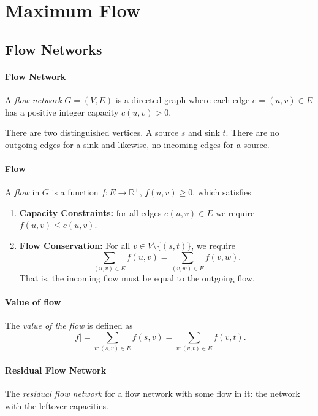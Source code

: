 
\section{Maximum Flow}

\subsection{Flow Networks}
\paragraph{Flow Network} A \textit{flow network} 
\( G = (V, E) \) is a directed graph where each edge \( e = (u, v) \in  E \) has a 
positive integer capacity \( c(u, v) > 0 \).

There are two distinguished vertices. A source \( s \) and sink  \( t \).
There are no outgoing edges for a sink and likewise, no incoming edges
for a source. \\

\paragraph{Flow} 
A \textit{flow} in \( G \) is a function  \( f: E \to  \mathbb R^+ \), 
\(  f(u, v) \geq 0 \). which satisfies
\begin{enumerate}
  \item \textbf{Capacity Constraints:} for all edges \(e(u,v) \in E\) we require 
  \(f(u,v) \leq c(u, v)\).
  \item \textbf{Flow Conservation:} For all \( v \in V \setminus \{(s, t)\} \),
    we require 
    \[
        \sum_{(u, v) \in E} f(u, v) = \sum_{(v, w) \in  E} f(v, w)
    .\]
    That is, the incoming flow must be equal to the outgoing flow.
\end{enumerate}

\paragraph{Value of flow} 
The \textit{value of the flow} is defined as 
\[|f| = \sum_{v:(s,v) \in E} f(s,v) = \sum_{v:(v,t)\in E} f(v,t).\]

\paragraph{Residual Flow Network} 
The \textit{residual flow network} for a flow network with some flow in it: the network 
with the leftover capacities.


